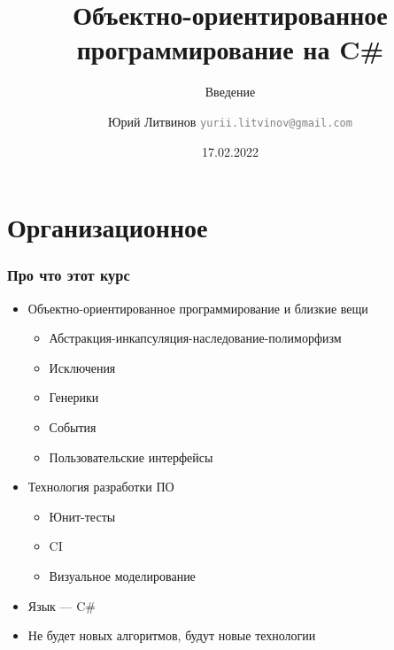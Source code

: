\documentclass[xetex,mathserif,serif]{beamer}
\title{Объектно-ориентированное программирование на C\#}
\subtitle{Введение}
\author[Юрий Литвинов]{Юрий Литвинов \newline \textcolor{gray}{\small\texttt{yurii.litvinov@gmail.com}}}
\date{17.02.2022}
\begin{document}
    
    \frame{\titlepage}

    \section{Организационное}

    \begin{frame}
        \frametitle{Про что этот курс}
        \begin{itemize}
            \item Объектно-ориентированное программирование и близкие вещи
            \begin{itemize}
                \item Абстракция-инкапсуляция-наследование-полиморфизм
                \item Исключения
                \item Генерики
                \item События
                \item Пользовательские интерфейсы
            \end{itemize}
            \item Технология разработки ПО
            \begin{itemize}
                \item Юнит-тесты
                \item CI
                \item Визуальное моделирование
            \end{itemize}
            \item Язык --- C\#
            \item Не будет новых алгоритмов, будут новые технологии
        \end{itemize}
    \end{frame}
\end{document}
